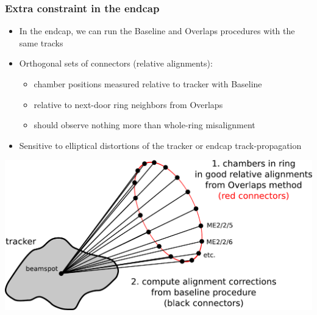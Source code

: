 \documentclass[compress]{beamer}
\begin{document}
\begin{frame}
\frametitle{Extra constraint in the endcap}

\begin{itemize}
\item In the endcap, we can run the Baseline and Overlaps procedures with the same tracks
\item Orthogonal sets of connectors (relative alignments):
\begin{itemize}
\item chamber positions measured relative to tracker with Baseline
\item relative to next-door ring neighbors from Overlaps
\item should observe nothing more than whole-ring misalignment
\end{itemize}
\item Sensitive to elliptical distortions of the tracker or endcap track-propagation
\end{itemize}

\vspace{-0.5 cm}
\begin{center}
\includegraphics[width=0.8\linewidth]{baseline_overlaps_interference.pdf}
\end{center}
\end{frame}
\end{document}
